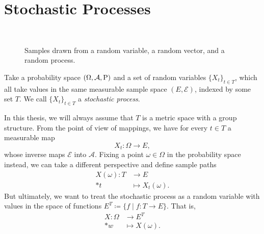 


\section{Stochastic Processes}~\label{sec:stoch_processes}
% 
\begin{figure}[b]
    \centering
    
    \caption{Samples drawn from a random variable, a random vector, and a random process.}
    \label{fig:random_variable_random_vector_random_process.pgf}
\end{figure}
% 
% 
\begin{definition}
    Take a probability space \((\Omega,\mathcal{A},\mathrm{P})\) and a set of random variables \( \{ X_{t} \}_{t \in T} \), which all take values in the same measurable sample space \( (E,\mathcal{E}) \), indexed by some set $T$. 
    We call \( \{ X_{t} \}_{t \in T} \) a \textit{stochastic process}.
\end{definition}
In this thesis, we will always assume that $T$ is a metric space with a group structure.
From the point of view of mappings, we have for every \( t \in T \) a measurable map
\[
    X_{t} \colon \Omega \to E,
\]
whose inverse maps $\mathcal{E}$ into $\mathcal{A}$.
Fixing a point \(  \omega \in \Omega \) in the probability space instead, we can take a different perspective and define sample paths
\begin{align*}
    X(\omega) \colon T &\to E \\*
    t &\mapsto X_{t}(\omega).
\end{align*}
But ultimately, we want to treat the stochastic process as a random variable with values in the space of functions \( E^{T} \coloneqq \{f \mid f \colon T \to E\} \).
That is,
\begin{align*}
    X \colon \Omega &\to E^{T}\\*
    w &\mapsto X(\omega).
\end{align*}
